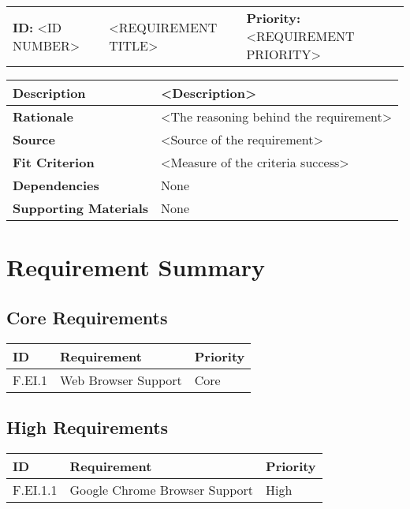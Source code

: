 \begin{table}[H]
    \begin{tabularx}{\textwidth}{| l | X | l |}
        \hline
        \textbf{ID:} <ID NUMBER> & <REQUIREMENT TITLE> & \textbf{Priority:} <REQUIREMENT PRIORITY> \\
    \end{tabularx}
    \begin{tabularx}{\textwidth}{| l | X |}
        \hline
        \textbf{Description} & <Description> \\ \hline
        \textbf{Rationale} & <The reasoning behind the requirement> \\ \hline
        \textbf{Source} &  <Source of the requirement>\\ \hline
        \textbf{Fit Criterion} &  <Measure of the criteria success>  \\ \hline
        \textbf{Dependencies} & None \\ \hline
        \textbf{Supporting Materials} & None \\ \hline
    \end{tabularx}
\end{table}



\clearpage

\section{Requirement Summary}
\subsection{Core Requirements}
\begin{table}[h]
    \begin{tabularx}{\textwidth}{ X | p{10cm} X }
        \hline
        \rowcolor[gray]{.9}
        \textbf{ID} & \textbf{Requirement} & \textbf{Priority} \\ \hline
        F.EI.1    &  Web Browser Support  &  Core    \\ \hline
    \end{tabularx}
\end{table}
\subsection{High Requirements}
\begin{table}[h]
    \begin{tabularx}{\textwidth}{ X p{10cm} X }
        \hline
        \rowcolor[gray]{.9}
        \textbf{ID} & \textbf{Requirement} & \textbf{Priority} \\ \hline
        F.EI.1.1  &  Google Chrome Browser Support    &  High    \\ \hline
    \end{tabularx}
\end{table}
